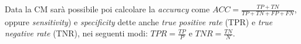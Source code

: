 Data la CM sarà possibile poi calcolare la \label{formula:accuracy}\emph{accuracy} come $ACC = \frac{TP+TN}{TP+TN+FP+FN}$, oppure \label{formula:sensitivity}\emph{sensitivity}) e \label{formula:specificity}\emph{specificity} dette anche \emph{true positive rate} (TPR) e \emph{true negative rate} (TNR), nei seguenti modi: $TPR = \frac{TP}{P}$  e $TNR = \frac{TN}{N}$.
